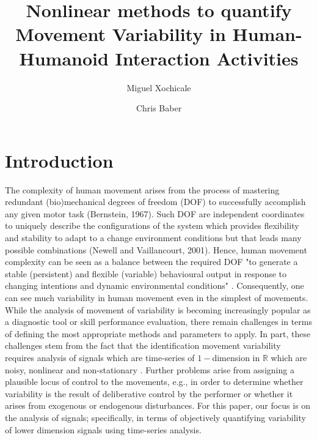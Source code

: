 \documentclass[fleqn,10pt]{wlscirep}
\title{Nonlinear methods to quantify Movement Variability in Human-Humanoid Interaction Activities}
\author[1,*]{Miguel Xochicale}
\author{Chris Baber}
\affil[1]{University of Birmingham,
	School of Computer Science,
	Birmingham, 
	B15 2TT, 
	UK}
\affil[*]{perez.xochicale@gmail.com}
\begin{document}
\flushbottom
\maketitle
\thispagestyle{empty}

\section*{Introduction}
The complexity of human movement arises from the process of mastering redundant (bio)mechanical degrees of freedom (DOF) to successfully accomplish any given motor task (Bernstein, 1967).
Such DOF are independent coordinates to uniquely describe the configurations of the system which provides flexibility and stability to adapt to a change environment conditions but that leads many possible combinations (Newell and Vaillancourt, 2001).
Hence, human movement complexity can be seen as a balance between the required DOF "to generate a stable (persistent) and flexible (variable) behavioural output in response to changing intentions and dynamic environmental conditions" \cite{davids2003}.
Consequently, one can see much variability in human movement even in the simplest of movements.
While the analysis of movement of variability is becoming increasingly popular as a diagnostic tool or skill performance evaluation, there remain challenges in terms of defining the most appropriate methods and parameters to apply.
In part, these challenges stem from the fact that the identification movement variability requires analysis of signals which are time-series of $1-$dimension in $\mathbb{R}$ which are noisy, nonlinear and non-stationary \cite{gomezgarcia2014}.
Further problems arise from assigning a plausible locus of control to the movements, e.g., in order to determine whether variability is the result of deliberative control by the performer or whether it arises from exogenous or endogenous disturbances.
For this paper, our focus is on the analysis of signals; specifically, in terms of objectively quantifying variability of lower dimension signals using time-series analysis.
\end{document}

